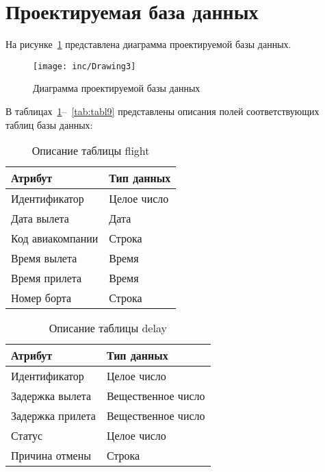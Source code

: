 \section{Проектируемая база данных}

На рисунке~\ref{fig:uml} представлена диаграмма проектируемой базы данных.
\begin{figure}[H]
    \centering
    \texttt{[image: inc/Drawing3]}
    \caption{Диаграмма проектируемой базы данных}
    \label{fig:uml}
\end{figure}

\newpage
В таблицах~\ref{tab:tabl1}--~\ref{tab:tabl9} представлены описания полей соответствующих таблиц базы данных:

\begin{table}[H]
    \centering
    \captionsetup{justification=centering}
    \caption{Описание таблицы flight}
    \begin{tabular}{|p{}|p{}|}
        \hline
        Атрибут & Тип данных \\
        \hline
        Идентификатор & Целое число \\
        Дата вылета & Дата \\
        Код авиакомпании & Строка \\
        Время вылета & Время \\
        Время прилета & Время \\
        Номер борта & Строка \\
        \hline
    \end{tabular}
    \label{tab:tabl1}
\end{table}

\begin{table}[H]
    \centering
    \captionsetup{justification=centering}
    \caption{Описание таблицы delay}
    \begin{tabular}{|p{}|p{}|}
        \hline
        Атрибут & Тип данных \\
        \hline
        Идентификатор & Целое число \\
        Задержка вылета & Вещественное число \\
        Задержка прилета & Вещественное число \\
        Статус & Целое число \\
        Причина отмены & Строка \\
        \hline
    \end{tabular}
    \label{tab:tabl2}
\end{table}

